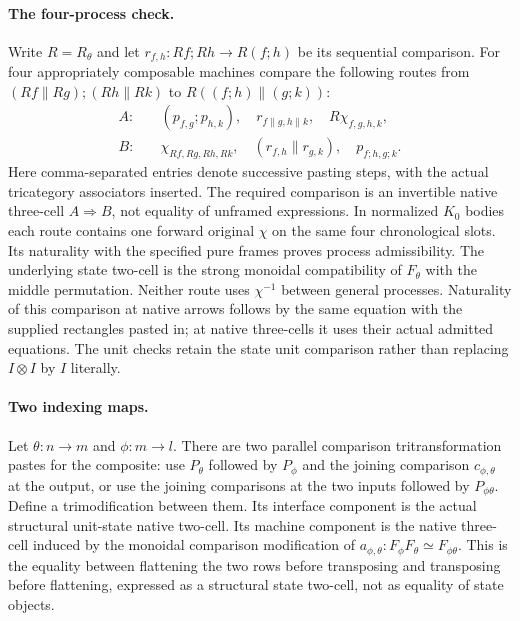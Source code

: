 \documentclass{article}
\begin{document}
\paragraph{The four-process check.} Write $R=R_\theta$ and let $r_{f,h}:Rf;Rh\to R(f;h)$ be its sequential comparison. For four appropriately composable machines compare the following routes from $(Rf\parallel Rg);(Rh\parallel Rk)$ to $R((f;h)\parallel(g;k))$:
\[
\begin{aligned}
 A:\quad &(p_{f,g};p_{h,k}),\quad
 r_{f\parallel g,h\parallel k},\quad R\chi_{f,g,h,k},\\
 B:\quad &\chi_{Rf,Rg,Rh,Rk},\quad
 (r_{f,h}\parallel r_{g,k}),\quad p_{f;h,g;k}.
\end{aligned}
\]
Here comma-separated entries denote successive pasting steps, with the actual tricategory associators inserted. The required comparison is an invertible native three-cell $A\Rightarrow B$, not equality of unframed expressions. In normalized $K_0$ bodies each route contains one forward original $\chi$ on the same four chronological slots. Its naturality with the specified pure frames proves process admissibility. The underlying state two-cell is the strong monoidal compatibility of $F_\theta$ with the middle permutation. Neither route uses $\chi^{-1}$ between general processes. Naturality of this comparison at native arrows follows by the same equation with the supplied rectangles pasted in; at native three-cells it uses their actual admitted equations. The unit checks retain the state unit comparison rather than replacing $I\otimes I$ by $I$ literally.

\paragraph{Two indexing maps.} Let $\theta:n\to m$ and $\phi:m\to l$. There are two parallel comparison tritransformation pastes for the composite: use $P_\theta$ followed by $P_\phi$ and the joining comparison $c_{\phi,\theta}$ at the output, or use the joining comparisons at the two inputs followed by $P_{\phi\theta}$. Define a trimodification between them. Its interface component is the actual structural unit-state native two-cell. Its machine component is the native three-cell induced by the monoidal comparison modification of
$a_{\phi,\theta}:F_\phi F_\theta\simeq F_{\phi\theta}$.
This is the equality between flattening the two rows before transposing and transposing before flattening, expressed as a structural state two-cell, not as equality of state objects.
\end{document}
